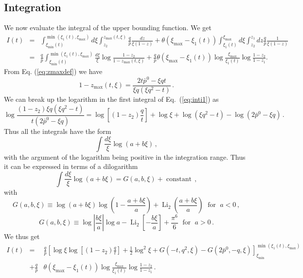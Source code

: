 \documentclass[11pt,a4paper]{article}
\newcommand{\tmop}[1]{\ensuremath{\operatorname{#1}}}
\begin{document}
\subsection{Integration}

We now evaluate the integral of the upper bounding function. We get
\begin{eqnarray}
  I (t) & = & \int_{\xi_{\min} (t)}^{\min (\xi_1 (t), \xi_{\max})} d \xi
  \int^{z_{\max} (t, \xi)}_{z_2} \frac{q}{\bar{p}} \frac{dz}{\xi (1 - z)} +
  \theta (\xi_{\max} - \xi_1 (t)) \int_{\xi_1 (t)}^{\xi_{\max}} d \xi
  \int^{z_1}_{z_2} dz \frac{q}{\bar{p}} \frac{1}{\xi (1 - z)} \nonumber\\
  & \! = \! & \! \frac{q}{\bar{p}} \int_{\xi_{\min} (t)}^{\min (\xi_1 (t),
  \xi_{\max})} \frac{d \xi}{\xi} \log \frac{1 - z_2}{1 - z_{\max} (t, \xi)} +
  \frac{q}{\bar{p}} \theta (\xi_{\max} - \xi_1 (t)) \log
  \frac{\xi_{\max}}{\xi_1 (t)} \log \frac{1 - z_2}{1 - z_1} . \label{eq:inti1}
\end{eqnarray}
From Eq. (\ref{eq:zmaxdef}) we have
\begin{equation}
  1 - z_{\max} (t, \xi) = \frac{2 t \bar{p}^0 - \xi qt}{\xi q (\xi q^2 - t)} \, .
\end{equation}
We can break up the logarithm in the first integral of Eq.~(\ref{eq:inti1}) as
\begin{equation}
\log \frac{(1 - z_2) \xi q (\xi q^2 - t)}{t (2 \bar{p}^0 - \xi q)} = \log
   \left[ (1 - z_2) \frac{q}{t} \right] + \log \xi + \log (\xi q^2 - t) - \log
   (2 \bar{p}^0 - \xi q) \, .
\end{equation}
Thus all the integrals have the form
\begin{equation}
  \int \frac{d \xi}{\xi} \log (a + b \xi) \, ,
\end{equation}
with the argument of the logarithm being positive in the integration range. Thus it
can be expressed in terms of a dilogarithm
\begin{equation}
  \int \frac{d \xi}{\xi} \log (a + b \xi) = G (a, b, \xi) + \tmop{constant} \, ,
\end{equation}
with
\begin{equation}
  G (a, b, \xi) \equiv \log (a + b \xi) \log \left( 1 - \frac{a + b \xi}{a}
  \right) + \tmop{Li}_2 \left( \frac{a + b \xi}{a} \right) \, \, \tmop{for} \, \, a < 0 \, ,
\end{equation}
\begin{equation}
  G (a, b, \xi) \equiv \log | \frac{b \xi}{a} | \log a - \tmop{Li}_2 \left[ -
  \frac{b \xi}{a} \right] + \frac{\pi^6}{6} \,\, \tmop{for} \,\, a > 0 \,.
\end{equation}
We thus get
\begin{eqnarray}
  I (t) & = & \frac{q}{\bar{p}} \left[ \log \xi \log \left[ (1 - z_2)
  \frac{q}{t} \right] + \frac{1}{2} \log^2 \xi + G (- t, q^2, \xi) - G (2
  \bar{p}^0, - q, \xi) \right]^{\min (\xi_1 (t), \xi_{\max})}_{\xi_{\min}}
  \nonumber\\
  & + \frac{q}{\bar{p}} & \theta (\xi_{\max} - \xi_1 (t)) \log
  \frac{\xi_{\max}}{\xi_1 (t)} \log \frac{1 - z_2}{1 - z_1} \,. 
\end{eqnarray}
\end{document}
